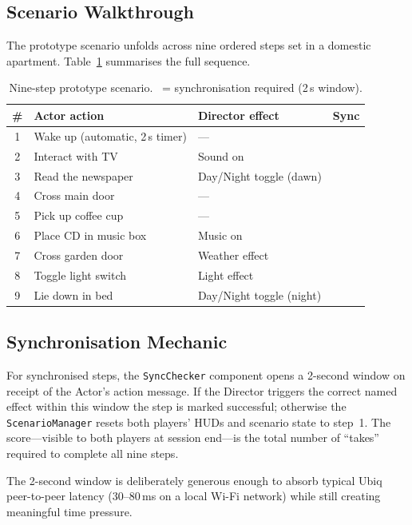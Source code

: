 \documentclass[12pt,a4paper]{article}
\newcommand{\yes}{\ding{51}}   %
\begin{document}
\subsection{Scenario Walkthrough}

The prototype scenario unfolds across nine ordered steps set in a domestic apartment. Table~\ref{tab:scenario} summarises the full sequence.

\begin{table}[H]
  \centering
  \caption{Nine-step prototype scenario. \yes\ = synchronisation required (2\,s window).}
  \label{tab:scenario}
  \small
  \begin{tabularx}{\linewidth}{@{} c X X c @{}}
    \toprule
    \textbf{\#} & \textbf{Actor action} & \textbf{Director effect} & \textbf{Sync} \\
    \midrule
    1 & Wake up (automatic, 2\,s timer) & --- & \\
    2 & Interact with TV & Sound on & \yes \\
    3 & Read the newspaper & Day/Night toggle (dawn) & \\
    4 & Cross main door & --- & \\
    5 & Pick up coffee cup & --- & \\
    6 & Place CD in music box & Music on & \yes \\
    7 & Cross garden door & Weather effect & \\
    8 & Toggle light switch & Light effect & \yes \\
    9 & Lie down in bed & Day/Night toggle (night) & \yes \\
    \bottomrule
  \end{tabularx}
\end{table}

\subsection{Synchronisation Mechanic}

For synchronised steps, the \texttt{SyncChecker} component opens a 2-second window on receipt of the Actor's action message. If the Director triggers the correct named effect within this window the step is marked successful; otherwise the \texttt{ScenarioManager} resets both players' HUDs and scenario state to step~1. The score---visible to both players at session end---is the total number of ``takes'' required to complete all nine steps.

The 2-second window is deliberately generous enough to absorb typical Ubiq peer-to-peer latency (30--80\,ms on a local Wi-Fi network) while still creating meaningful time pressure.
\end{document}
